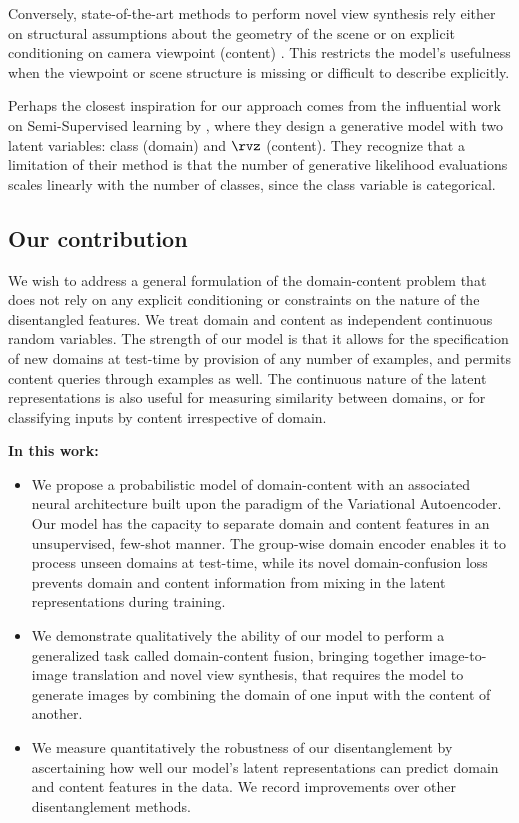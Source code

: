 \documentclass{article} %
\begin{document}
Conversely, state-of-the-art methods to perform novel view synthesis rely either on structural assumptions about the geometry of the scene \citep{sitzmann2019scene, yoon2020novel} or on explicit conditioning on camera viewpoint (content) \citep{eslami2018neural, mildenhall2020nerf}. This restricts the model's usefulness when the viewpoint or scene structure is missing or difficult to describe explicitly.

Perhaps the closest inspiration for our approach comes from the influential work on Semi-Supervised learning by \citet{kingma2014semi}, where they design a generative model with two latent variables: class (domain) and $\rvz$ (content). They recognize that a limitation of their method is that the number of generative likelihood evaluations scales linearly with the number of classes, since the class variable is categorical. 

\subsection{Our contribution}

We wish to address a general formulation of the domain-content problem that does not rely on any explicit conditioning or constraints on the nature of the disentangled features. We treat domain and content as independent continuous random variables. The strength of our model is that it allows for the specification of new domains at test-time by provision of any number of examples, and permits content queries through examples as well. The continuous nature of the latent representations is also useful for measuring similarity between domains, or for classifying inputs by content irrespective of domain.

\textbf{In this work:}

\begin{itemize}
\item We propose a probabilistic model of domain-content with an associated neural architecture built upon the paradigm of the Variational Autoencoder. Our model has the capacity to separate domain and content features in an unsupervised, few-shot manner. The group-wise domain encoder enables it to process unseen domains at test-time, while its novel domain-confusion loss prevents domain and content information from mixing in the latent representations during training.

\item We demonstrate qualitatively the ability of our model to perform a generalized task called domain-content fusion, bringing together image-to-image translation and novel view synthesis, that requires the model to generate images by combining the domain of one input with the content of another.

\item We measure quantitatively the robustness of our disentanglement by ascertaining how well our model's latent representations can predict domain and content features in the data. We record improvements over other disentanglement methods.
\end{itemize}
\end{document}
